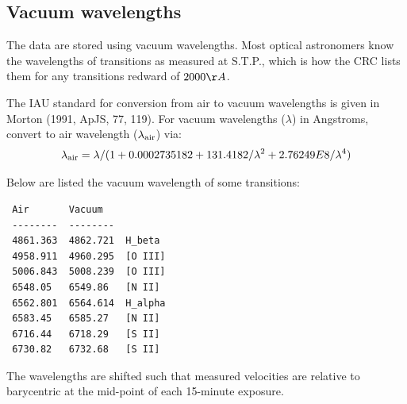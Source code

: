 \documentclass[12pt,preprint]{aastex}
\begin{document}
\subsection{Vacuum wavelengths}

The data are stored using vacuum wavelengths.
Most optical astronomers know the wavelengths of transitions
as measured at S.T.P., which is how the CRC lists them for any
transitions redward of $2000\AA$.

The IAU standard for conversion from air to vacuum wavelengths
is given in Morton (1991, ApJS, 77, 119). For vacuum wavelengths ($\lambda$)
in Angstroms, convert to air wavelength ($\lambda_{\rm air}$) via:
$$\lambda_{\rm air} = \lambda / (1 + 0.0002735182 + 131.4182 / \lambda^2 + 2.76249E8 / \lambda^4) $$

Below are listed the vacuum wavelength of some transitions:
\begin{verbatim}
 Air       Vacuum
 --------  --------
 4861.363  4862.721  H_beta
 4958.911  4960.295  [O III]
 5006.843  5008.239  [O III]
 6548.05   6549.86   [N II]
 6562.801  6564.614  H_alpha
 6583.45   6585.27   [N II]
 6716.44   6718.29   [S II]
 6730.82   6732.68   [S II]
\end{verbatim}
The wavelengths are shifted such that measured velocities are relative
to barycentric at the mid-point of each 15-minute exposure.


\begin{figure}
\end{figure}


\begin{figure}
\end{figure}
\end{document}
